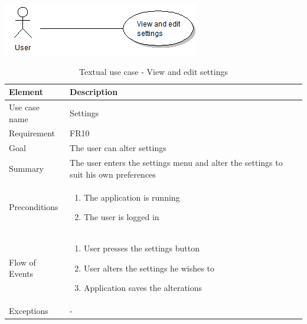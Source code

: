 \begin{table}
\begin{center}
\begin{center}
\includegraphics[width=\textwidth]{settings}
\end{center}
\begin{tabular}{p{3cm}|p{12cm}} \hline
\textbf{Element} & \textbf{Description} \\ \hline \hline
Use case name & Settings \\ 
Requirement & FR10 \\
Goal & The user can alter settings \\ \hline
Summary & The user enters the settings menu and alter the settings to suit his own preferences \\ \hline
Preconditions &
\begin{enumerate}
\item{}The application is running
\item{}The user is logged in
\end{enumerate} \\ \hline
Flow of Events &
\begin{enumerate}
\item{}User presses the settings button
\item{}User alters the settings he wishes to
\item{}Application saves the alterations
\end{enumerate} \\ \hline
Exceptions & - \\ \hline
\end{tabular}
\end{center}
\caption{Textual use case - View and edit settings} \label{tab:settings}
\end{table}

